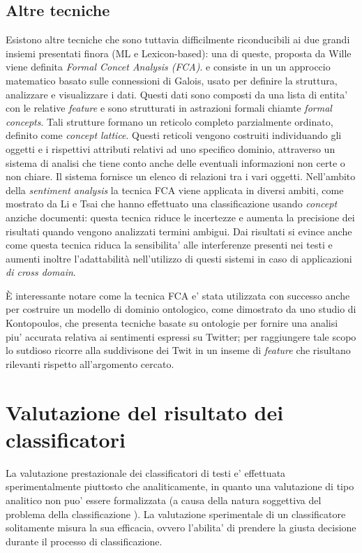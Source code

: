 \documentclass[a4paper,12pt,openright,twoside]{report}
\theoremstyle{definition}
\begin{document}
\subsection{Altre tecniche}
Esistono altre tecniche che sono tuttavia difficilmente riconducibili ai due grandi insiemi presentati finora (ML e Lexicon-based):
una di queste, proposta da Wille %
viene definita \emph{Formal Concet Analysis (FCA)}.
e consiste in un un approccio matematico basato sulle connessioni
di Galois, usato per definire la struttura, analizzare e visualizzare i dati.
Questi dati sono composti da una lista di entita' con le relative \emph{feature} e sono strutturati
in astrazioni formali chiamte \emph{formal concepts}. Tali strutture formano un reticolo completo 
parzialmente ordinato, definito come \emph{concept lattice}. Questi reticoli vengono costruiti
individuando gli oggetti e i rispettivi attributi relativi ad uno specifico dominio, attraverso
un sistema di analisi che tiene conto anche delle eventuali informazioni non certe o non chiare.
Il sistema
fornisce un elenco di relazioni tra i vari oggetti.
Nell'ambito della \emph{sentiment analysis} la tecnica FCA viene applicata in diversi ambiti,
come mostrato da Li e Tsai %
che hanno effettuato una classificazione usando \emph{concept} anziche documenti: questa tecnica
riduce le incertezze e aumenta la precisione dei risultati quando vengono analizzati termini ambigui.
Dai risultati si evince anche come questa tecnica riduca la sensibilita' alle interferenze presenti nei testi
e aumenti inoltre l'adattabilità nell'utilizzo di questi sistemi in caso di applicazioni \emph{di cross domain}.

\`E interessante notare come la tecnica FCA e' stata utilizzata con successo
anche per costruire un modello di dominio ontologico, come dimostrato da uno
studio di Kontopoulos, %
che presenta
tecniche basate su ontologie per fornire una analisi piu' accurata relativa ai sentimenti espressi
su Twitter; per raggiungere tale scopo lo
sutdioso ricorre alla suddivisone dei Twit in un inseme di \emph{feature} che risultano rilevanti
rispetto all'argomento cercato.

\section{Valutazione del risultato dei classificatori}
La valutazione prestazionale dei classificatori di testi e' effettuata sperimentalmente
piuttosto che analiticamente, in quanto una valutazione di tipo analitico non puo' essere
formalizzata (a causa della natura soggettiva del problema della classificazione ). La
valutazione sperimentale di un classificatore solitamente misura la sua efficacia, ovvero
l’abilita' di prendere la giusta decisione durante il processo di classificazione.
\end{document}
